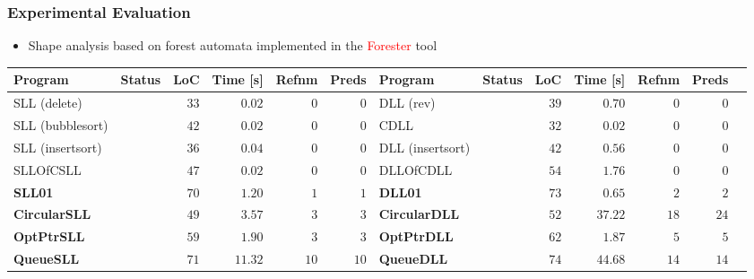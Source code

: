 \documentclass{beamer}
\newcommand{\hlrd}[1]{\textcolor{red}{#1}}
\newcommand{\hcol}[1]{yellow!20!orange!20}
\newcommand{\scol}[1]{blue!40}
\begin{document}
\begin{frame}
\frametitle{Experimental Evaluation}
    \begin{itemize}
        \item Shape analysis based on forest automata implemented in the \hlrd{Forester} tool
    \end{itemize}
	\begin{center}
	\begin{adjustbox}{max height=\textheight, max width=\textwidth}
	\begin{tabular}{| l | l | r | r | r | r || l | l | r | r | r | r | r |}
        \hline
		Program & Status & LoC & Time [s] & Refnm& Preds & Program & Status & LoC & Time [s] & Refnm & Preds \\
        \hline
        \hline
		SLL (delete) & \cellcolor{\scol{}} \safe & $33$ & $0.02$ &  $0$ & $0$ & DLL (rev) & \cellcolor{\scol{}} \safe & $39$ &  $0.70$ & $0$  & $0$ \\
        \hline
		SLL (bubblesort) & \cellcolor{\scol{}} \safe & $42$ & $0.02$ &  $0$ & $0$ & CDLL & \cellcolor{\scol{}} \safe & $32$ &  $0.02$  & $0$  & $0$ \\
        \hline
		SLL (insertsort) & \cellcolor{\scol{}} \safe & $36$ & $0.04$ & $0$ & $0$ & DLL (insertsort) & \cellcolor{\scol{}} \safe & $42$ &  $0.56$  & $0$  & $0$ \\
        \hline
		SLLOfCSLL & \cellcolor{\scol{}} \safe & $47$ & $0.02$ & $0$ & $0$ & DLLOfCDLL & \cellcolor{\scol{}} \safe & $54$ &  $1.76$  & $0$  & $0$ \\
        \hline
		\rowcolor{\hcol{}}
		\textbf{SLL01}    & \cellcolor{\scol{}} \safe & $70$ & $1.20$   &  $1$ & $1$ & \textbf{DLL01} & \cellcolor{\scol{}} \safe & $73$ &  $0.65$  & $2$  & $2$ \\
        \hline
		\rowcolor{\hcol{}}
		\textbf{CircularSLL} & \cellcolor{\scol{}} \safe & $49$ & $3.57$   &  $3$  & $3$ & \textbf{CircularDLL} & \cellcolor{\scol{}} \safe  & $52$ &  $37.22$ & $18$ & $24$ \\
        \hline
		\rowcolor{\hcol{}}
		\textbf{OptPtrSLL}   & \cellcolor{\scol{}} \safe & $59$ & $1.90$ & $3$ & $3$ & \textbf{OptPtrDLL} &\cellcolor{\scol{}} \safe & $62$ &  $1.87$  & $5$ & $5$ \\
        \hline
		\rowcolor{\hcol{}}
		\textbf{QueueSLL}    & \cellcolor{\scol{}} \safe & $71$ & $11.32$  &  $10$ & $10$ & \textbf{QueueDLL} &  \cellcolor{\scol{}}  \safe  & $74$ &  $44.68$ & $14$ & $14$ \\

\end{tabular}
\end{adjustbox}
\end{center}
\end{frame}
\end{document}
